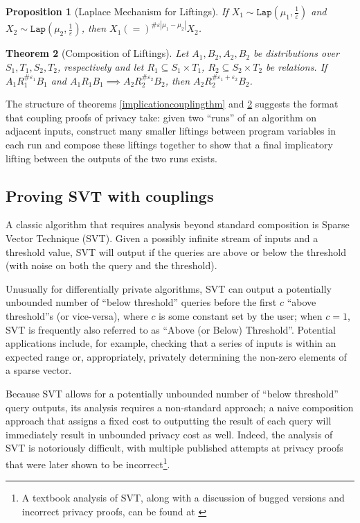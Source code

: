 \documentclass[12pt]{article}
\newcommand{\Lap}{\texttt{Lap}}
\newtheorem{thm}{Theorem}[section]
\newtheorem{prop}[thm]{Proposition}
\theoremstyle{definition}
\begin{document}
\begin{prop}[Laplace Mechanism for Liftings]
    If $X_1\sim\Lap(\mu_1, \frac{1}{\varepsilon})$ and $X_2\sim\Lap(\mu_2, \frac{1}{\varepsilon})$, then $X_1(=)^{\#\varepsilon|\mu_1-\mu_2|}X_2$.
\end{prop}

\begin{thm}[Composition of Liftings]\label{liftingcomposition}
    Let $A_1, B_2, A_2, B_2$ be distributions over $S_1, T_1, S_2, T_2$, respectively and let $R_1\subseteq S_1\times T_1$, $R_2\subseteq S_2\times T_2$ be relations. If $A_1 R_1^{\#\varepsilon_1}B_1$ and $A_1 R_1 B_1\implies A_2R_2^{\#\varepsilon_2}B_2$, then $A_2 R_2^{\#\varepsilon_1+\varepsilon_2}B_2$.
\end{thm}

The structure of theorems \ref{implicationcouplingthm} and \ref{liftingcomposition} suggests the format that coupling proofs of privacy take: given two ``runs'' of an algorithm on adjacent inputs, construct many smaller liftings between program variables in each run and compose these liftings together to show that a final implicatory lifting between the outputs of the two runs exists. 

\subsection{Proving SVT with couplings}

A classic algorithm that requires analysis beyond standard composition is Sparse Vector Technique (SVT). Given a possibly infinite stream of inputs and a threshold value, SVT will output if the queries are above or below the threshold (with noise on both the query and the threshold). 

Unusually for differentially private algorithms, SVT can output a potentially unbounded number of ``below threshold'' queries before the first $c$ ``above threshold''s (or vice-versa), where $c$ is some constant set by the user; when $c=1$, SVT is frequently also referred to as ``Above (or Below) Threshold''. Potential applications include, for example, checking that a series of inputs is within an expected range or, appropriately, privately determining the non-zero elements of a sparse vector. 

Because SVT allows for a potentially unbounded number of ``below threshold'' query outputs, its analysis requires a non-standard approach; a naive composition approach that assigns a fixed cost to outputting the result of each query will immediately result in unbounded privacy cost as well. 
Indeed, the analysis of SVT is notoriously difficult, with multiple published attempts at privacy proofs that were later shown to be incorrect\footnote{A textbook analysis of SVT, along with a discussion of bugged versions and incorrect privacy proofs, can be found at \cite{10.14778/3055330.3055331}}. 
\end{document}
